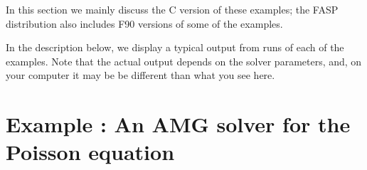 \documentclass[11pt]{memoir}
\begin{document}
In this section we mainly discuss the C version of these examples; the FASP
distribution also includes F90 versions of some of the examples. 

\begin{snugshade}\noindent 
  In the description below, we display a typical output from runs of
  each of the examples.  Note that the actual output depends on the
  solver parameters, and, on your computer it may be be different than
  what you see here.
\end{snugshade}

\setcounter{ex}{1}

\section{Example : An AMG solver for the Poisson equation}\label{sec:ex1}
\addtocounter{ex}{1}
\end{document}
